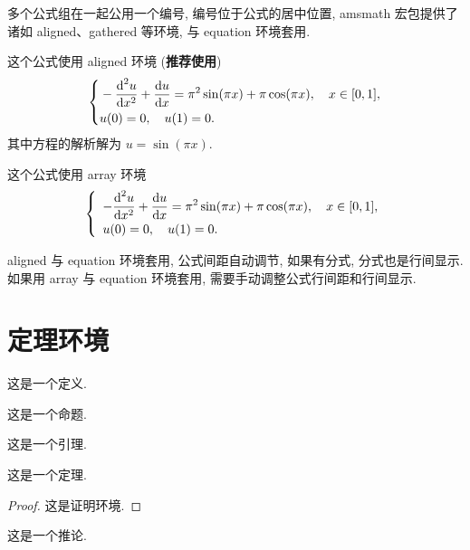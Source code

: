 多个公式组在一起公用一个编号, 编号位于公式的居中位置, amsmath 宏包提供了诸如 aligned、gathered 等环境, 与 equation 环境套用.

这个公式使用 aligned 环境 (\textbf{推荐使用})
\begin{equation}\label{eq:alignedEq}
\left\{\begin{aligned}
  &-\frac{{\mathop{}\!\mathrm{d}}^{2} u}{\mathop{}\!\mathrm{d} x^{2}}+\frac{\mathrm{d} u}{\mathop{}\!\mathrm{d} x}=\pi^{2} \sin (\pi x)+\pi \cos (\pi x),\quad x \in [0,1], \\
  &u(0)=0,\quad u(1)=0.
\end{aligned} \right.
\end{equation}
其中方程的解析解为 $u=\sin(\pi x)$.

这个公式使用 array 环境
\begin{equation}\label{eq:arrayEq}
\left\{\begin{array}{l}
\displaystyle
-\frac{{\mathop{}\!\mathrm{d}}^{2} u}{\mathop{}\!\mathrm{d} x^{2}}+\frac{\mathop{}\!\mathrm{d} u}{\mathop{}\!\mathrm{d} x}=\pi^{2} \sin (\pi x)+\pi \cos (\pi x),\quad x \in [0,1], \\[6pt]
u(0)=0,\quad u(1)=0.
\end{array} \right.
\end{equation}

aligned 与 equation 环境套用, 公式间距自动调节, 如果有分式, 分式也是行间显示. 如果用 array 与 equation 环境套用, 需要手动调整公式行间距和行间显示.


\section{定理环境}

\begin{definition}\label{def:foo}
这是一个定义.
\end{definition}

\begin{proposition}\label{prop:foo}
这是一个命题.
\end{proposition}

\begin{lemma}[Lemma]\label{lmm:foo}
这是一个引理.
\end{lemma}

\begin{theorem}[Theorem]\label{thm:foo}
这是一个定理.
\end{theorem}
\begin{proof}
这是证明环境.
\end{proof}

\begin{corollary}\label{cor:foo}
这是一个推论.
\end{corollary}

